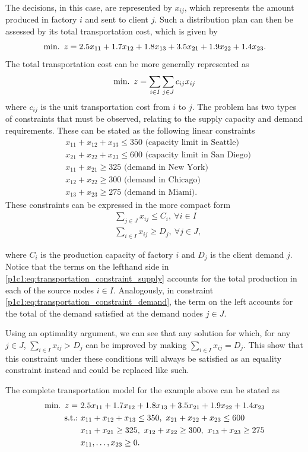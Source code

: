 The decisions, in this case, are represented by $x_{ij}$, which represents the amount produced in factory $i$ and sent to client $j$. Such a distribution plan can then be assessed by its total transportation cost, which is given by
%
$$ 
\mathop{\text{min.~}} z = 2.5x_{11} + 1.7x_{12} + 1.8x_{13} + 3.5x_{21} + 1.9x_{22} + 1.4x_{23}.
$$
%
The total transportation cost can be more generally represented as
%
$$
\mathop{\text{min.~}} z = \sum_{i \in I}\sum_{j \in J}c_{ij}x_{ij}
$$
%
where $c_{ij}$ is the unit transportation cost from $i$ to $j$.
%
The problem has two types of constraints that must be observed, relating to the supply capacity and demand requirements. These can be stated as the following linear constraints
%
\begin{align*}
	& x_{11} + x_{12} + x_{13} \leq 350 \text{ (capacity limit in Seattle)}\\
	& x_{21} + x_{22} + x_{23} \leq 600 \text{ (capacity limit in San Diego)}\\
	& x_{11} + x_{21} \geq 325 \text{ (demand in New York)}\\
	& x_{12} + x_{22} \geq 300 \text{ (demand in Chicago)}\\
	& x_{13} + x_{23} \geq 275 \text{ (demand in Miami)}.
\end{align*}
%
These constraints can be expressed in the more compact form
%
\begin{align}
	& \sum_{j \in J} x_{ij} \leq C_i, ~\forall i \in I \label{p1c1:eq:transportation_constraint_supply}\\
	& \sum_{i \in I} x_{ij} \geq D_j, ~\forall j \in J, \label{p1c1:eq:transportation_constraint_demand}
\end{align}

where $C_i$ is the production capacity of factory $i$ and $D_j$ is the client demand $j$. Notice that the terms on the lefthand side in \eqref{p1c1:eq:transportation_constraint_supply} accounts for the total production in each of the source nodes $i \in I$. Analogously, in constraint \eqref{p1c1:eq:transportation_constraint_demand}, the term on the left accounts for the total of the demand satisfied at the demand nodes $j \in J$. 

Using an optimality argument, we can see that any solution for which, for any $j \in J$, $\sum_{i \in I} x_{ij} > D_j$ can be improved by making $\sum_{i \in I} x_{ij} = D_j$. This show that this constraint under these conditions will always be satisfied as an equality constraint instead and could be replaced like such. 

The complete transportation model for the example above can be stated as 
%
\begin{align*}
	\mini z = \ &2.5x_{11} + 1.7x_{12} + 1.8x_{13} + 3.5x_{21} + 1.9x_{22} + 1.4x_{23} \\
	\st & x_{11} + x_{12} + x_{13} \leq 350, \ 
	x_{21} + x_{22} + x_{23} \leq 600\\
	& x_{11} + x_{21} \geq 325, \ x_{12} + x_{22} \geq 300, \ x_{13} + x_{23} \geq 275\\
	& x_{11}, \dots, x_{23} \geq 0.
\end{align*}
%

